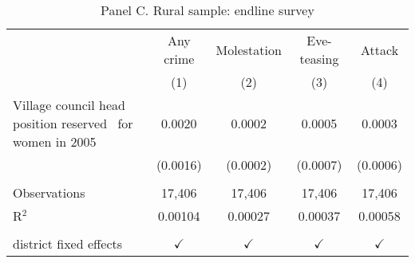 \begin{table}[htbp]
   \caption{Panel C. Rural sample: endline survey}
   \bigskip
   \centering
   \begin{tabular}{lcccc}
      \toprule
                                                                   & Any crime     & Molestation   & Eve-teasing   & Attack\\  
                                                                   & (1)           & (2)           & (3)           & (4)\\  
      \midrule 
       Village council head position reserved \ for women in 2005  & 0.0020        & 0.0002        & 0.0005        & 0.0003\\   
                                                                   & (0.0016)      & (0.0002)      & (0.0007)      & (0.0006)\\   
       \\
      Observations                                                 & 17,406        & 17,406        & 17,406        & 17,406\\  
      R$^2$                                                        & 0.00104       & 0.00027       & 0.00037       & 0.00058\\  
       \\
      district fixed effects                                       & $\checkmark$  & $\checkmark$  & $\checkmark$  & $\checkmark$\\   
      \bottomrule
   \end{tabular}
\end{table}


